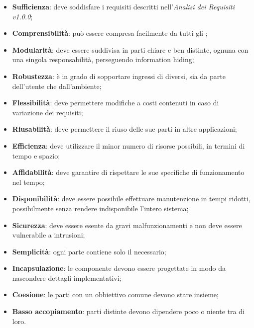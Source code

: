 \begin{itemize}
	\item \textbf{Sufficienza}: deve soddisfare i requisiti descritti nell'\textit{Analisi dei Requisiti v1.0.0};
	\item \textbf{Comprensibilità}: può essere compresa facilmente da tutti gli ;
	\item \textbf{Modularità}: deve essere suddivisa in parti chiare e ben distinte, ognuna con una singola responsabilità, perseguendo information hiding;
	\item \textbf{Robustezza}: è in grado di sopportare ingressi di diversi, sia da parte dell'utente che dall'ambiente;
	\item \textbf{Flessibilità}: deve permettere modifiche a costi contenuti in caso di variazione dei requisiti;
	\item \textbf{Riusabilità}: deve permettere il riuso delle sue parti in altre applicazioni;
	\item \textbf{Efficienza}: deve utilizzare il minor numero di risorse possibili, in termini di tempo e spazio;
	\item \textbf{Affidabilità}: deve garantire di rispettare le sue specifiche di funzionamento nel tempo;
	\item \textbf{Disponibilità}: deve essere possibile effettuare manutenzione in tempi ridotti, possibilmente senza rendere indisponibile l'intero sistema;
	\item \textbf{Sicurezza}: deve essere esente da gravi malfunzionamenti e non deve essere vulnerabile a intrusioni;
	\item \textbf{Semplicità}: ogni parte contiene solo il necessario;
	\item \textbf{Incapsulazione}: le componente devono essere progettate in modo da nascondere dettagli implementativi;
	\item \textbf{Coesione}: le parti con un obbiettivo comune devono stare insieme;
	\item \textbf{Basso accopiamento}: parti distinte devono dipendere poco o niente tra di loro.
\end{itemize}

